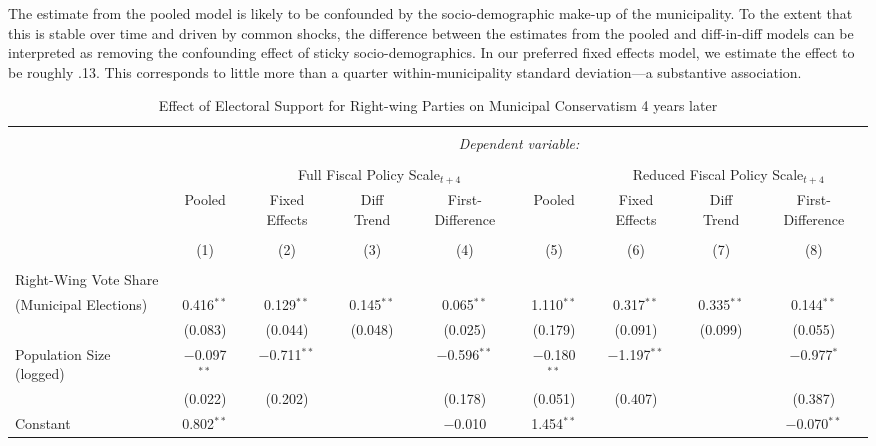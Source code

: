 \documentclass[a4paper,12pt]{article}
\begin{document}
The estimate from the pooled model is likely to be confounded by the socio-demographic make-up of the municipality. To the extent that this is stable over time and driven by common shocks, the difference between the estimates from the pooled and diff-in-diff models can be interpreted as removing the confounding effect of sticky socio-demographics. In our preferred fixed effects model, we estimate the effect to be roughly .13. This corresponds to little more than a quarter within-municipality standard deviation---a substantive association. 


\begin{landscape}
	
	
	\begin{table}[!htbp] \centering 
		\caption{Effect of Electoral Support for Right-wing Parties on Municipal Conservatism 4 years later} 
		\label{tab:FourYearLead} 
		\begin{tabular}{@{\extracolsep{5pt}}lcccccccc} 
			\\[-1.8ex]\hline 
			\hline \\[-1.8ex] 
			& \multicolumn{8}{c}{\textit{Dependent variable:}} \\ 
			\cline{2-9} 
			\\[-1.8ex] & & \multicolumn{3}{c}{Full Fiscal Policy Scale$_{t+4}$} & 	&\multicolumn{3}{c}{Reduced Fiscal Policy Scale$_{t+4}$}   \\ 
			& Pooled & Fixed Effects & Diff Trend & First-Difference & Pooled & Fixed Effects & Diff Trend & First-Difference \\ 
			\\[-1.8ex] & (1) & (2) & (3) & (4) & (5) & (6) & (7) & (8)\\ 
			\hline \\[-1.8ex] 
		Right-Wing Vote Share\\(Municipal Elections)  & 0.416$^{**}$ & 0.129$^{**}$ & 0.145$^{**}$ & 0.065$^{**}$  & 1.110$^{**}$ & 0.317$^{**}$ & 0.335$^{**}$ & 0.144$^{**}$ \\ 
			& (0.083) & (0.044) & (0.048) & (0.025)  & (0.179) & (0.091) & (0.099) &  (0.055) \\ 
			Population Size (logged) & $-$0.097$^{**}$ & $-$0.711$^{**}$ &  & $-$0.596$^{**}$  & $-$0.180$^{**}$ & $-$1.197$^{**}$ &  & $-$0.977$^{*}$ \\ 
			& (0.022) & (0.202) &  & (0.178)  & (0.051) & (0.407) &  &  (0.387) \\ 
			Constant & 0.802$^{**}$ &  &  & $-$0.010 & 1.454$^{**}$ &  &  & $-$0.070$^{**}$ \\ 

\end{tabular}
\end{table}
\end{landscape}
\end{document}
